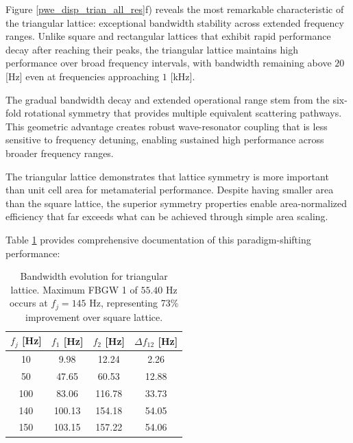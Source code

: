 \documentclass[review,numbers,sort&compress]{elsarticle}
\begin{document}
Figure \ref{pwe_disp_trian_all_res}f) reveals the most remarkable characteristic of the triangular lattice: exceptional bandwidth stability across extended frequency ranges. Unlike square and rectangular lattices that exhibit rapid performance decay after reaching their peaks, the triangular lattice maintains high performance over broad frequency intervals, with bandwidth remaining above $20$ [Hz] even at frequencies approaching $1$ [kHz].

The gradual bandwidth decay and extended operational range stem from the six-fold rotational symmetry that provides multiple equivalent scattering pathways. This geometric advantage creates robust wave-resonator coupling that is less sensitive to frequency detuning, enabling sustained high performance across broader frequency ranges.

The triangular lattice demonstrates that lattice symmetry is more important than unit cell area for metamaterial performance. Despite having smaller area than the square lattice, the superior symmetry properties enable area-normalized efficiency that far exceeds what can be achieved through simple area scaling.

Table \ref{tab_trian_latice_fbgw} provides comprehensive documentation of this paradigm-shifting performance:
\newpage
\begin{table}[htb]
    \centering
    \caption{Bandwidth evolution for triangular lattice. Maximum FBGW 1 of $55.40$ Hz occurs at $f_j = 145$ Hz, representing 73\% improvement over square lattice.}
    \label{tab_trian_latice_fbgw}
    \begin{tabular}{cccc}
        \hline
        $f_j$ [Hz] & $f_1$ [Hz] & $f_2$ [Hz] & $\Delta f_{12}$ [Hz] \\
        \hline
        10  & 9.98  & 12.24  & 2.26 \\
        50  & 47.65 & 60.53  & 12.88 \\
        100 & 83.06  & 116.78 & 33.73 \\
        140 & 100.13 & 154.18 & 54.05 \\
        150 & 103.15 & 157.22 & 54.06 \\
        \hline
    \end{tabular}
\end{table}
\end{document}
